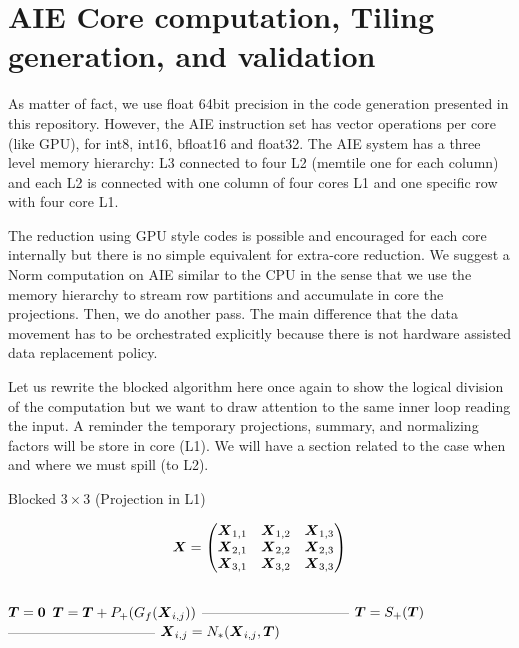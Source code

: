 \documentclass[acmsmall]{acmart}
\begin{document}
\section{AIE Core computation, Tiling generation, and validation}
As matter of fact, we use float 64bit precision in the code generation
presented in this repository. However, the AIE instruction set has
vector operations per core (like GPU), for int8, int16, bfloat16 and
float32. The AIE system has a three level memory hierarchy: L3
connected to four L2 (memtile one for each column) and each L2 is
connected with one column of four cores L1 and one specific row with
four core L1.

The reduction using GPU style codes is possible and encouraged for
each core internally but there is no simple equivalent for extra-core
reduction. We suggest a Norm computation on AIE similar to the CPU in
the sense that we use the memory hierarchy to stream row partitions
and accumulate in core the projections. Then, we do another pass. The
main difference that the data movement has to be orchestrated
explicitly because there is not hardware assisted data replacement
policy.

Let us rewrite the blocked algorithm here once again to show the
logical division of the computation but we want to draw attention to
the same inner loop reading the input. A reminder the temporary
projections, summary, and normalizing factors will be store in core
(L1). We will have a section related to the case when and where we
must spill (to L2).

{\small \begin{algorithm}
    \caption{Blocked $3\times 3$ (Projection in L1)}
    \label{alg:l2_5}
    \begin{algorithmic}
      \STATE \[
        {\boldsymbol X}  =   \begin{pmatrix}
          {\boldsymbol X}_{1,1} &    {\boldsymbol X}_{1,2}&    {\boldsymbol X}_{1,3}  \\
          {\boldsymbol X}_{2,1} &    {\boldsymbol X}_{2,2}&    {\boldsymbol X}_{2,3}  \\
          {\boldsymbol X}_{3,1} &    {\boldsymbol X}_{3,2}&    {\boldsymbol X}_{3,3}  \\
        \end{pmatrix}
      \] \\
          \STATE ${\boldsymbol T} = {\boldsymbol 0} $  
              \STATE ${\boldsymbol T} = {\boldsymbol T} +P_+(G_{f}({\boldsymbol X}_{i,j}))$   
          \ENDWHILE
          \STATE --------------------------------     
          \STATE ${\boldsymbol T}  =   S_+({\boldsymbol T})$       
          \STATE --------------------------------     
             \STATE $ {\boldsymbol X}_{i,j} = N_*({\boldsymbol X}_{i,j},{\boldsymbol T})$  
          \ENDWHILE
      \ENDWHILE
    \end{algorithmic}
\end{algorithm} }
\end{document}
